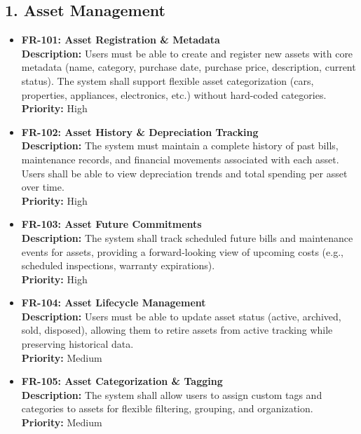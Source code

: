 \documentclass[11pt, a4paper]{article}
\newcommand{\reqid}[1]{\textbf{\color{PrimaryColor}#1}}
\begin{document}
	\subsection{1. Asset Management}
	\begin{itemize}
		\item \reqid{FR-101: Asset Registration \& Metadata} \\
		\textbf{Description:} Users must be able to create and register new assets with core metadata (name, category, purchase date, purchase price, description, current status). The system shall support flexible asset categorization (cars, properties, appliances, electronics, etc.) without hard-coded categories. \\
		\textbf{Priority:} High
		
		\item \reqid{FR-102: Asset History \& Depreciation Tracking} \\
		\textbf{Description:} The system must maintain a complete history of past bills, maintenance records, and financial movements associated with each asset. Users shall be able to view depreciation trends and total spending per asset over time. \\
		\textbf{Priority:} High
		
		\item \reqid{FR-103: Asset Future Commitments} \\
		\textbf{Description:} The system shall track scheduled future bills and maintenance events for assets, providing a forward-looking view of upcoming costs (e.g., scheduled inspections, warranty expirations). \\
		\textbf{Priority:} High
		
		\item \reqid{FR-104: Asset Lifecycle Management} \\
		\textbf{Description:} Users must be able to update asset status (active, archived, sold, disposed), allowing them to retire assets from active tracking while preserving historical data. \\
		\textbf{Priority:} Medium
		
		\item \reqid{FR-105: Asset Categorization \& Tagging} \\
		\textbf{Description:} The system shall allow users to assign custom tags and categories to assets for flexible filtering, grouping, and organization. \\
		\textbf{Priority:} Medium
	\end{itemize}
	
\end{document}
